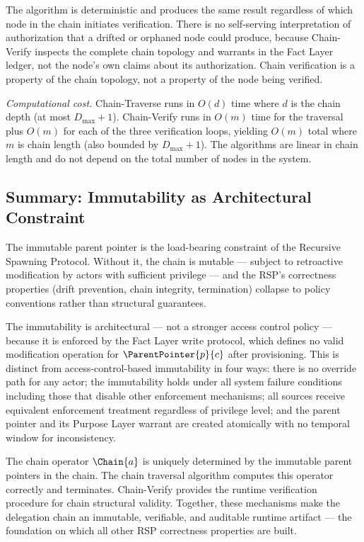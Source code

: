 The algorithm is deterministic and produces the same result regardless of which node in the chain initiates verification. There is no self-serving interpretation of authorization that a drifted or orphaned node could produce, because Chain-Verify inspects the complete chain topology and warrants in the Fact Layer ledger, not the node's own claims about its authorization. Chain verification is a property of the chain topology, not a property of the node being verified.

\textit{Computational cost.} Chain-Traverse runs in $O(d)$ time where $d$ is the chain depth (at most $D_{\max} + 1$). Chain-Verify runs in $O(m)$ time for the traversal plus $O(m)$ for each of the three verification loops, yielding $O(m)$ total where $m$ is chain length (also bounded by $D_{\max} + 1$). The algorithms are linear in chain length and do not depend on the total number of nodes in the system.

\subsection{Summary: Immutability as Architectural Constraint}
\label{sec:immutability-summary}

The immutable parent pointer is the load-bearing constraint of the Recursive Spawning Protocol. Without it, the chain is mutable — subject to retroactive modification by actors with sufficient privilege — and the RSP's correctness properties (drift prevention, chain integrity, termination) collapse to policy conventions rather than structural guarantees.

The immutability is architectural — not a stronger access control policy — because it is enforced by the Fact Layer write protocol, which defines no valid modification operation for $\ParentPointer{p}{c}$ after provisioning. This is distinct from access-control-based immutability in four ways: there is no override path for any actor; the immutability holds under all system failure conditions including those that disable other enforcement mechanisms; all sources receive equivalent enforcement treatment regardless of privilege level; and the parent pointer and its Purpose Layer warrant are created atomically with no temporal window for inconsistency.

The chain operator $\Chain{a}$ is uniquely determined by the immutable parent pointers in the chain. The chain traversal algorithm computes this operator correctly and terminates. Chain-Verify provides the runtime verification procedure for chain structural validity. Together, these mechanisms make the delegation chain an immutable, verifiable, and auditable runtime artifact — the foundation on which all other RSP correctness properties are built.